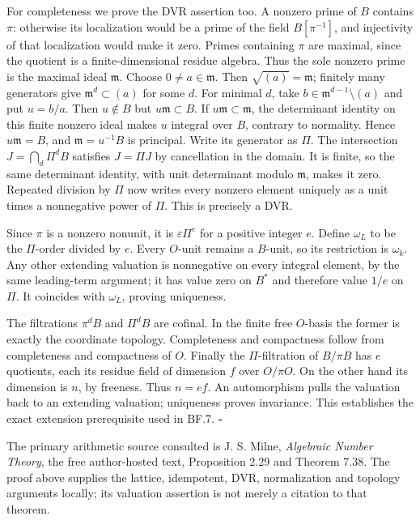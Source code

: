 \documentclass[
  11pt,
]{article}
\begin{document}
For completeness we prove the DVR assertion too. A nonzero prime of
\(B\) contains \(\pi\): otherwise its localization would be a prime of
the field \(B[\pi^{-1}]\), and injectivity of that localization would
make it zero. Primes containing \(\pi\) are maximal, since the quotient
is a finite-dimensional residue algebra. Thus the sole nonzero prime is
the maximal ideal \(\mathfrak m\). Choose \(0\ne a\in\mathfrak m\). Then
\(\sqrt{(a)}=\mathfrak m\); finitely many generators give
\(\mathfrak m^d\subset(a)\) for some \(d\). For minimal \(d\), take
\(b\in\mathfrak m^{d-1}\setminus(a)\) and put \(u=b/a\). Then
\(u\notin B\) but \(u\mathfrak m\subset B\). If
\(u\mathfrak m\subset\mathfrak m\), the determinant identity on this
finite nonzero ideal makes \(u\) integral over \(B\), contrary to
normality. Hence \(u\mathfrak m=B\), and \(\mathfrak m=u^{-1}B\) is
principal. Write its generator as \(\Pi\). The intersection
\(J=\bigcap_d\Pi^dB\) satisfies \(J=\Pi J\) by cancellation in the
domain. It is finite, so the same determinant identity, with unit
determinant modulo \(\mathfrak m\), makes it zero. Repeated division by
\(\Pi\) now writes every nonzero element uniquely as a unit times a
nonnegative power of \(\Pi\). This is precisely a DVR.

Since \(\pi\) is a nonzero nonunit, it is \(\varepsilon\Pi^e\) for a
positive integer \(e\). Define \(\omega_L\) to be the \(\Pi\)-order
divided by \(e\). Every \(O\)-unit remains a \(B\)-unit, so its
restriction is \(\omega_k\). Any other extending valuation is
nonnegative on every integral element, by the same leading-term
argument; it has value zero on \(B^*\) and therefore value \(1/e\) on
\(\Pi\). It coincides with \(\omega_L\), proving uniqueness.

The filtrations \(\pi^dB\) and \(\Pi^dB\) are cofinal. In the finite
free \(O\)-basis the former is exactly the coordinate topology.
Completeness and compactness follow from completeness and compactness of
\(O\). Finally the \(\Pi\)-filtration of \(B/\pi B\) has \(e\)
quotients, each its residue field of dimension \(f\) over \(O/\pi O\).
On the other hand its dimension is \(n\), by freeness. Thus \(n=ef\). An
automorphism pulls the valuation back to an extending valuation;
uniqueness proves invariance. This establishes the exact extension
prerequisite used in BF.7. \(\square\)

The primary arithmetic source consulted is J. S. Milne, \emph{Algebraic
Number Theory}, the free author-hosted text, Proposition 2.29 and
Theorem 7.38. The proof above supplies the lattice, idempotent, DVR,
normalization and topology arguments locally; its valuation assertion is
not merely a citation to that theorem.
\end{document}

